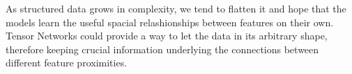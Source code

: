 \documentclass{article}
\theoremstyle{definition}
\theoremstyle{definition}
\begin{document}
As structured data grows in complexity, we tend to flatten it and hope that the models learn the useful spacial relashionships between features on their own. Tensor Networks could provide a way to let the data in its arbitrary shape, therefore keeping crucial information underlying the connections between different feature proximities.



\printbibliography
\end{document}
